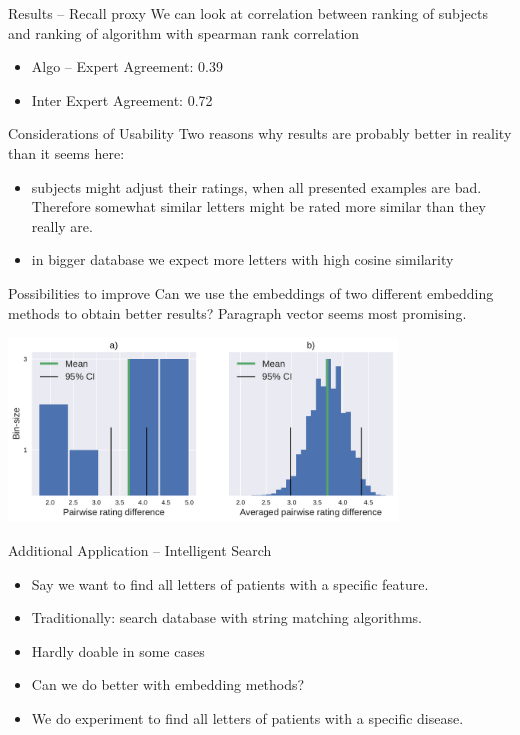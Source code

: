 \documentclass[10pt]{beamer}
\begin{document}
\begin{frame}{Results -- Recall proxy}
	We can look at correlation between ranking of subjects and ranking of algorithm with spearman rank correlation
	\begin{itemize}
		\item Algo -- Expert Agreement: 0.39
		\item Inter Expert Agreement: 0.72
	\end{itemize}
\end{frame}


\begin{frame}{Considerations of Usability}
	Two reasons why results are probably better in reality than it seems here:
	\begin{itemize}
		\item subjects might adjust their ratings, when all presented examples are bad. Therefore somewhat similar letters might be rated more similar than they really are.
		\item in bigger database we expect more letters with high cosine similarity
	\end{itemize}
\end{frame}


\begin{frame}{Possibilities to improve}
	Can we use the embeddings of two different embedding methods to obtain better results? Paragraph vector seems most promising.
	
	\begin{center}
		\includegraphics[height=4.9cm]{both_diff_pv}
	\end{center}
\end{frame}


\begin{frame}{Additional Application -- Intelligent Search}
	\begin{itemize}
		\item Say we want to find all letters of patients with a specific feature.
		\item Traditionally: search database with string matching algorithms.
		\item Hardly doable in some cases
		\item Can we do better with embedding methods?
		\item We do experiment to find all letters of patients with a specific disease.
	\end{itemize}

\end{frame}
\end{document}
